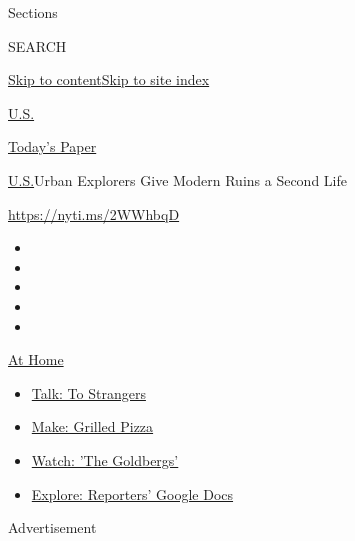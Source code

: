 Sections

SEARCH

\protect\hyperlink{site-content}{Skip to
content}\protect\hyperlink{site-index}{Skip to site index}

\href{https://www.nytimes3xbfgragh.onion/section/us}{U.S.}

\href{https://myaccount.nytimes3xbfgragh.onion/auth/login?response_type=cookie\&client_id=vi}{}

\href{https://www.nytimes3xbfgragh.onion/section/todayspaper}{Today's
Paper}

\href{/section/us}{U.S.}\textbar{}Urban Explorers Give Modern Ruins a
Second Life

\url{https://nyti.ms/2WWhbqD}

\begin{itemize}
\item
\item
\item
\item
\item
\end{itemize}

\href{https://www.nytimes3xbfgragh.onion/spotlight/at-home?action=click\&pgtype=Article\&state=default\&region=TOP_BANNER\&context=at_home_menu}{At
Home}

\begin{itemize}
\tightlist
\item
  \href{https://www.nytimes3xbfgragh.onion/2020/08/03/well/family/the-benefits-of-talking-to-strangers.html?action=click\&pgtype=Article\&state=default\&region=TOP_BANNER\&context=at_home_menu}{Talk:
  To Strangers}
\item
  \href{https://www.nytimes3xbfgragh.onion/2020/08/01/at-home/coronavirus-make-pizza-on-a-grill.html?action=click\&pgtype=Article\&state=default\&region=TOP_BANNER\&context=at_home_menu}{Make:
  Grilled Pizza}
\item
  \href{https://www.nytimes3xbfgragh.onion/2020/07/31/arts/television/goldbergs-abc-stream.html?action=click\&pgtype=Article\&state=default\&region=TOP_BANNER\&context=at_home_menu}{Watch:
  'The Goldbergs'}
\item
  \href{https://www.nytimes3xbfgragh.onion/interactive/2020/at-home/even-more-reporters-editors-diaries-lists-recommendations.html?action=click\&pgtype=Article\&state=default\&region=TOP_BANNER\&context=at_home_menu}{Explore:
  Reporters' Google Docs}
\end{itemize}

Advertisement

